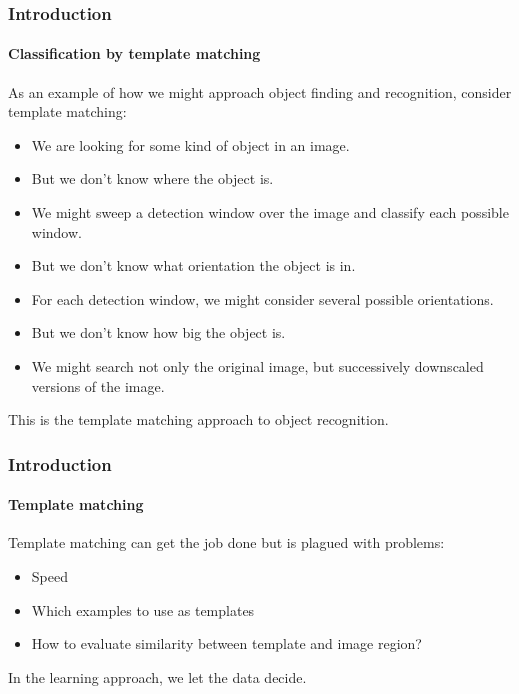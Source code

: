 \documentclass[aspectratio=169]{beamer}
\begin{document}
\begin{frame}
\frametitle{Introduction}
\framesubtitle{Classification by template matching}

As an example of how we might approach object finding and recognition,
consider \alert{template matching}:
\begin{itemize}
\item We are looking for some kind of object in an image.
\item But we don't know \alert{where} the object is.
\item We might sweep a \alert{detection window} over the image and
  classify each possible window.
\item But we don't know \alert{what orientation} the object is in.
\item For each detection window, we might consider several possible
  orientations.
\item But we don't know \alert{how big} the object is.
\item We might search not only the original image, but successively
  \alert{downscaled} versions of the image.
\end{itemize}

\medskip

This is the \alert{template matching} approach to object recognition.

\end{frame}


\begin{frame}
\frametitle{Introduction}
\framesubtitle{Template matching}

Template matching can get the job done but is plagued with problems:
\begin{itemize}
    \item Speed
    \item Which examples to use as templates
    \item How to evaluate similarity between template and image region?
\end{itemize}

\medskip

In the learning approach, we \alert{let the data decide}.

\end{frame}
\end{document}
